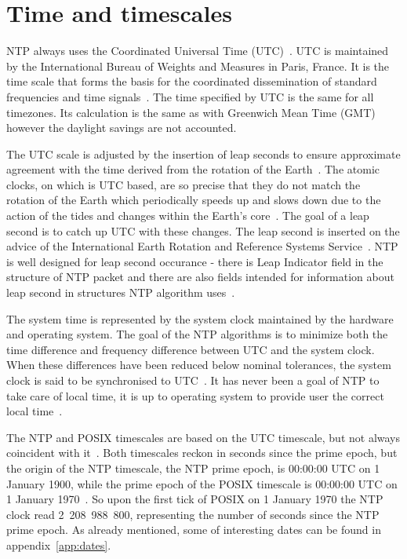 
\section{Time and timescales}\label{sec:ntp-time}
NTP always uses the Coordinated Universal Time (UTC)~\cite{rfc5905}.
UTC is maintained by the International Bureau of Weights and Measures in Paris, France.
It is the time scale that forms the basis for the coordinated dissemination
of standard frequencies and time signals~\cite{bipm-utc}.
The time specified by UTC is the same for all timezones.
Its calculation is the same as with Greenwich Mean Time (GMT) however
the daylight savings are not accounted.

The UTC scale is adjusted by the insertion of leap seconds to ensure approximate
agreement with the time derived from the rotation of the Earth~\cite{bipm-utc}.
The atomic clocks, on which is UTC based, are so precise that
they do not match the rotation of the Earth
which periodically speeds up and slows down due to the action
of the tides and changes within the Earth's core~\cite{cnn-earth}.
The goal of a leap second is to catch up UTC with these changes.
The leap second is inserted on the advice of the International Earth Rotation and Reference Systems Service~\cite{bipm-utc}.
NTP is well designed for leap second occurance -
there is Leap Indicator field
in the structure of NTP packet and there are also fields intended for
information about leap second in structures NTP algorithm uses~\cite{rfc5905}.

The system time is represented by the system clock maintained by
the hardware and operating system.
The goal of the NTP algorithms is to minimize
both the time difference and frequency difference between UTC and the system clock.
When these differences have been reduced below nominal
tolerances, the system clock is said to be synchronised to UTC~\cite{rfc5905}.
It has never been a goal of NTP to take care of local time,
it is up to operating system to provide user the correct local time~\cite{ntp-overview}.

The NTP and POSIX timescales are based on the UTC timescale,
but not always coincident with it~\cite{ntp-leap}.
Both timescales reckon in seconds since the prime epoch,
but the origin of the NTP timescale, the NTP prime epoch, is 00:00:00 UTC on 1 January 1900,
while the prime epoch of the POSIX timescale is 00:00:00 UTC on 1 January 1970~\cite{ntp-leap}.
So upon the first tick of POSIX on 1 January 1970 the NTP clock read 2~208~988~800,
representing the number of seconds since the NTP prime epoch.
As already mentioned, some of interesting dates
can be found in appendix~\ref{app:dates}.
